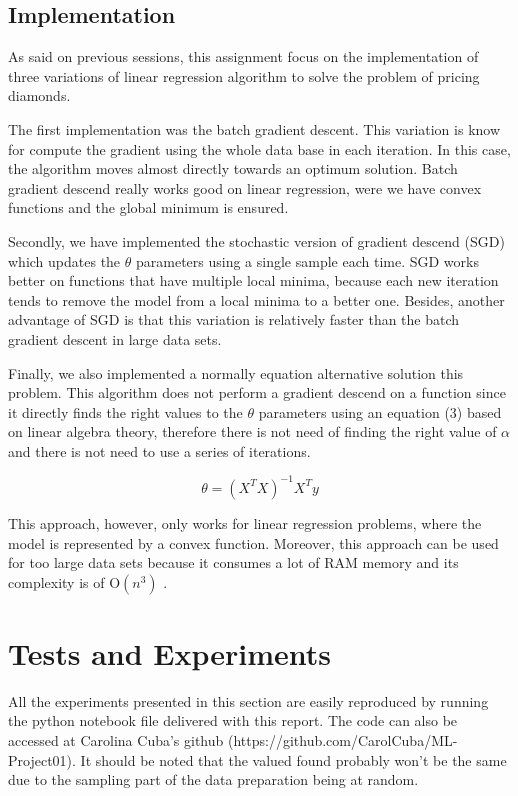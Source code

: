 \documentclass[conference]{IEEEtran}
\begin{document}
\subsection{Implementation}
	As said on previous sessions, this assignment focus on the implementation of three variations of linear regression algorithm to solve the problem of pricing diamonds.\par
    The first implementation was the batch gradient descent. This variation is know for compute the gradient using the whole data base in each iteration. In this case, the algorithm moves almost directly towards an optimum solution. Batch gradient descend really works good on linear regression, were we have convex functions and the global minimum is ensured.\par
    Secondly, we have implemented the stochastic version of gradient descend (SGD) which updates the $\theta$ parameters using a single sample each time. SGD works better on functions that have multiple local minima, because each new iteration tends to remove the model from a local minima to a better one. Besides, another advantage of SGD is that this variation is relatively faster than the batch gradient descent in large data sets.\par
    Finally, we also implemented a normally equation alternative solution this problem. This algorithm does not perform a gradient descend on a function since it directly finds the right values to the $\theta$ parameters using an equation (3) based on linear algebra theory, therefore there is not need of finding the right value of $\alpha$ and there is not need to use a series of iterations.\par

\begin{equation}
\theta = (X^T X)^{-1} X^T y
\end{equation}

This approach, however, only works for linear regression problems, where the model is represented by a convex function. Moreover, this approach can be used for too large data sets because it consumes a lot of RAM memory and its complexity is of O\((n^3)\) .\par

\section{Tests and Experiments}
 	All the experiments presented in this section are easily reproduced by running the python notebook file delivered with this report. The code can also be accessed at Carolina Cuba's github (https://github.com/CarolCuba/ML-Project01). It should be noted that the valued found probably won't be the same due to the sampling part of the data preparation being at random.
	
\end{document}
